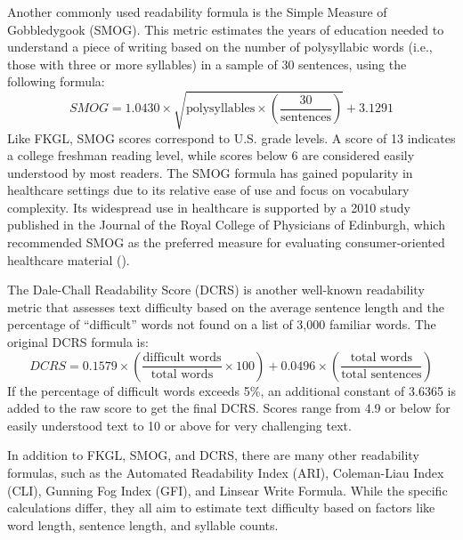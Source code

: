 Another commonly used readability formula is the Simple Measure of Gobbledygook (SMOG). This metric estimates the years of education needed to understand a piece of writing based on the number of polysyllabic words (i.e., those with three or more syllables) in a sample of 30 sentences, using the following formula:
$$SMOG = 1.0430 \times \sqrt{\text{polysyllables} \times \left(\frac{30}{\text{sentences}}\right)} + 3.1291$$
Like FKGL, SMOG scores correspond to U.S. grade levels. A score of 13 indicates a college freshman reading level, while scores below 6 are considered easily understood by most readers. The SMOG formula has gained popularity in healthcare settings due to its relative ease of use and focus on vocabulary complexity. Its widespread use in healthcare is supported by a 2010 study published in the Journal of the Royal College of Physicians of Edinburgh, which recommended SMOG as the preferred measure for evaluating consumer-oriented healthcare material (\cite{Fitzsimmons2010-mq}).

The Dale-Chall Readability Score (DCRS) is another well-known readability metric that assesses text difficulty based on the average sentence length and the percentage of ``difficult'' words not found on a list of 3,000 familiar words. The original DCRS formula is:
$$DCRS = 0.1579 \times \left(\frac{\text{difficult words}}{\text{total words}} \times 100\right) + 0.0496 \times \left(\frac{\text{total words}}{\text{total sentences}}\right)$$
If the percentage of difficult words exceeds 5\%, an additional constant of 3.6365 is added to the raw score to get the final DCRS. Scores range from 4.9 or below for easily understood text to 10 or above for very challenging text.

In addition to FKGL, SMOG, and DCRS, there are many other readability formulas, such as the Automated Readability Index (ARI), Coleman-Liau Index (CLI), Gunning Fog Index (GFI), and Linsear Write Formula. While the specific calculations differ, they all aim to estimate text difficulty based on factors like word length, sentence length, and syllable counts.

